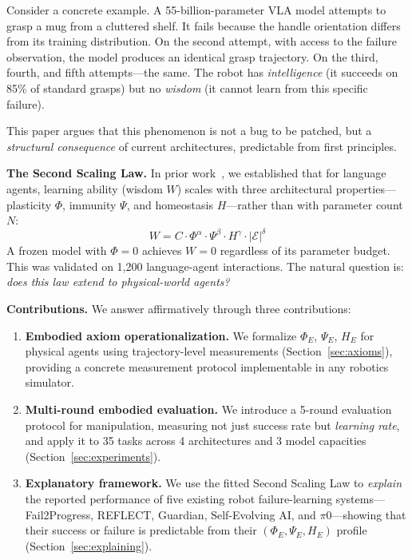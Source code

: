 \documentclass{article}
\newcommand{\cE}{\mathcal{E}}
\begin{document}
Consider a concrete example.
A 55-billion-parameter VLA model attempts to grasp a mug from a cluttered shelf.
It fails because the handle orientation differs from its training distribution.
On the second attempt, with access to the failure observation, the model produces an identical grasp trajectory.
On the third, fourth, and fifth attempts---the same.
The robot has \emph{intelligence} (it succeeds on 85\% of standard grasps) but no \emph{wisdom} (it cannot learn from this specific failure).

This paper argues that this phenomenon is not a bug to be patched, but a \emph{structural consequence} of current architectures, predictable from first principles.

\textbf{The Second Scaling Law.}
In prior work~\citep{sovereign2026p4}, we established that for language agents, learning ability (wisdom $W$) scales with three architectural properties---plasticity $\Phi$, immunity $\Psi$, and homeostasis $H$---rather than with parameter count $N$:
\begin{equation}
    W = C \cdot \Phi^\alpha \cdot \Psi^\beta \cdot H^\gamma \cdot |\cE|^\delta
    \label{eq:ssl}
\end{equation}
A frozen model with $\Phi = 0$ achieves $W = 0$ regardless of its parameter budget.
This was validated on 1{,}200 language-agent interactions.
The natural question is: \emph{does this law extend to physical-world agents?}

\textbf{Contributions.}
We answer affirmatively through three contributions:

\begin{enumerate}[leftmargin=*,itemsep=2pt]
    \item \textbf{Embodied axiom operationalization.}
    We formalize $\Phi_E$, $\Psi_E$, $H_E$ for physical agents using trajectory-level measurements (Section~\ref{sec:axioms}), providing a concrete measurement protocol implementable in any robotics simulator.

    \item \textbf{Multi-round embodied evaluation.}
    We introduce a 5-round evaluation protocol for manipulation, measuring not just success rate but \emph{learning rate}, and apply it to 35 tasks across 4 architectures and 3 model capacities (Section~\ref{sec:experiments}).

    \item \textbf{Explanatory framework.}
    We use the fitted Second Scaling Law to \emph{explain} the reported performance of five existing robot failure-learning systems---Fail2Progress, REFLECT, Guardian, Self-Evolving AI, and $\pi$0---showing that their success or failure is predictable from their $(\Phi_E, \Psi_E, H_E)$ profile (Section~\ref{sec:explaining}).
\end{enumerate}
\end{document}
